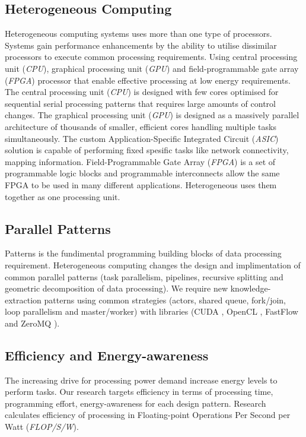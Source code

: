 \documentclass{acm_proc_article-sp}
\begin{document}
\subsection{Heterogeneous Computing}
Heterogeneous computing systems \cite{khokhar1993heterogeneous} uses more than one type of processors. Systems gain performance enhancements by the ability to utilise dissimilar processors to execute common processing requirements. Using central processing unit (\textit{CPU}), graphical processing unit (\textit{GPU}) and field-programmable gate array (\textit{FPGA}) processor that enable effective processing at low energy requirements.
The central processing unit (\textit{CPU}) is designed with few cores optimised for sequential serial processing patterns that requires large amounts of control changes. The graphical processing unit (\textit{GPU}) is designed as a massively parallel architecture of thousands of smaller, efficient cores handling multiple tasks simultaneously. The custom Application-Specific Integrated Circuit (\textit{ASIC}) solution is capable of performing fixed spesific tasks like network connectivity, mapping information. Field-Programmable Gate Array (\textit{FPGA}) is a set of programmable logic blocks and programmable interconnects allow the same FPGA \cite{shagrithaya2012enabling} to be used in many different applications. Heterogeneous uses them together as one processing unit.
\subsection{Parallel Patterns}
Patterns is the fundimental programming building blocks of data processing requirement. Heterogeneous computing changes the design and implimentation of common parallel patterns (task parallelism, pipelines, recursive splitting and geometric decomposition of data processing). We require new knowledge-extraction patterns using common strategies (actors, shared queue, fork/join, loop parallelism and master/worker) with libraries (CUDA \cite{cudawebsite}, OpenCL \cite{khronoswebsite,khronos18opencl,shagrithaya2012enabling,stone2010opencl}, FastFlow \cite{aldinucci2011fastflow} and ZeroMQ \cite{hintjens2011omq}).
\subsection{Efficiency and Energy-awareness}
The increasing drive for processing power demand increase energy levels to perform tasks. Our research targets efficiency in terms of processing time, programming effort, energy-awareness for each design pattern. Research calculates efficiency of processing \cite{wu2014heterogeneous} in Floating-point Operations Per Second per Watt (\textit{FLOP/S/W}). 
\end{document}
